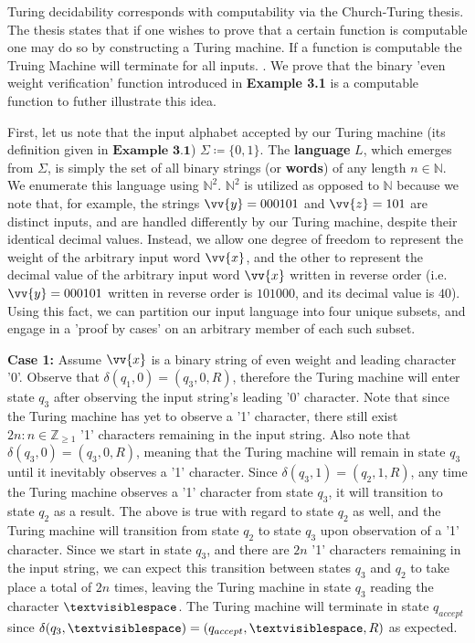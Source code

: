 \documentclass{article}
\begin{document}
\noindent Turing decidability corresponds with computability via the Church-Turing thesis. The thesis states that if one wishes to prove that a certain function is computable one may do so by constructing a Turing machine. If a function is computable the Truing Machine will terminate for all inputs. \cite{6}. We prove that the binary 'even weight verification' function introduced in \textbf{Example 3.1} is a computable function to futher illustrate this idea.
\begin{prf}
	First, let us note that the input alphabet accepted by our Turing machine (its definition given in $\textbf{Example 3.1}$) $\Sigma \coloneq \{ 0, 1 \}$.  The \textbf{language} $L$, which emerges from $\Sigma$, is simply the set of all binary strings (or \textbf{words}) of any length $n \in \mathbb{N}$.  We enumerate this language using $\mathbb{N}^{2}$.  $\mathbb{N}^{2}$ is utilized as opposed to $\mathbb{N}$ because we note that, for example, the strings $\vv{y}=000101$ and $\vv{z}=101$ are distinct inputs, and are handled differently by our Turing machine, despite their identical decimal values. Instead, we allow one degree of freedom to represent the weight of the arbitrary input word $\vv{x}$, and the other to represent the decimal value of the arbitrary input word $\vv{x}$ written in reverse order (i.e. $\vv{y}=000101$ written in reverse order is $101000$, and its decimal value is $40$).  Using this fact, we can partition our input language into four unique subsets, and engage in a 'proof by cases' on an arbitrary member of each such subset.\\
\begin{adjustwidth}{0.5cm}{}
	\textbf{Case 1:} Assume $\vv{x}$ is a binary string of even weight and leading character '0'.  Observe that $\delta(q_{1}, 0) = (q_{3}, 0, R)$, therefore the Turing machine will enter state $q_{3}$ after observing the input string's leading '0' character.  Note that since the Turing machine has yet to observe a '1' character, there still exist $2n : n \in \mathbb{Z}_{\geq 1}$ '1' characters remaining in the input string.  Also note that $\delta(q_{3}, 0) = (q_{3}, 0, R)$, meaning that the Turing machine will remain in state $q_{3}$ until it inevitably observes a '1' character.  Since $\delta(q_{3}, 1) = (q_{2}, 1, R)$, any time the Turing machine observes a '1' character from state $q_{3}$, it will transition to state $q_{2}$ as a result.  The above is true with regard to state $q_{2}$ as well, and the Turing machine will transition from state $q_{2}$ to state $q_{3}$ upon observation of a '1' character.  Since we start in state $q_{3}$, and there are $2n$ '1' characters remaining in the input string, we can expect this transition between states $q_{3}$ and $q_{2}$ to take place a total of $2n$ times, leaving the Turing machine in state $q_{3}$ reading the character $\textvisiblespace$.  The Turing machine will terminate in state $q_{accept}$ since $\delta(q_{3}, \textvisiblespace) = (q_{accept}, \textvisiblespace, R)$ as expected.\\

\end{adjustwidth}
\end{prf}
\end{document}

